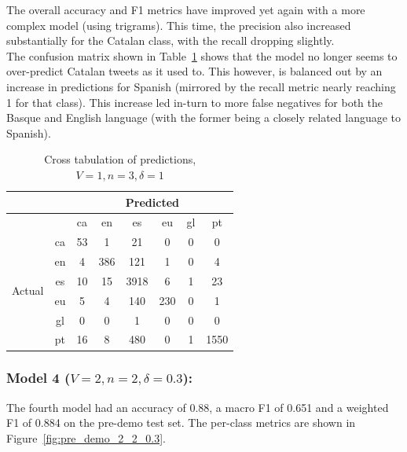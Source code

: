 \documentclass[runningheads]{llncs}
\begin{document}
The overall accuracy and F1 metrics have improved yet again with a more complex model (using trigrams). This time, the precision also increased substantially for the Catalan class, with the recall dropping slightly. \\

The confusion matrix shown in Table~\ref{tab:pre_demo_confusion_1_3_1} shows that the model no longer seems to over-predict Catalan tweets as it used to. This however, is balanced out by an increase in predictions for Spanish (mirrored by the recall metric nearly reaching 1 for that class). This increase led in-turn to more false negatives for both the Basque and English language (with the former being a closely related language to Spanish).

\begin{table}
	\centering
	\caption{Cross tabulation of predictions, $V=1, n=3, \delta=1$}
	\label{tab:pre_demo_confusion_1_3_1}
	\begin{tabular}{|c|c|c|c|c|c|c|c|} \hline
		& & \multicolumn{6}{c|}{Predicted} \\ \hline
		& &  ca &   en &    es &   eu &  gl &    pt \\ \hline
		\multirow{6}{*}{Actual} & ca   &  53 &    1 &    21 &    0 &   0 &     0 \\
		& en   &   4 &  386 &   121 &    1 &   0 &     4 \\
		& es   &  10 &   15 &  3918 &    6 &   1 &    23 \\
		& eu   &   5 &    4 &   140 &  230 &   0 &     1 \\
		& gl   &   0 &    0 &     1 &    0 &   0 &     0 \\
		& pt   &  16 &    8 &   480 &    0 &   1 &  1550 \\ \hline
	\end{tabular}
\end{table}

\subsubsection{Model 4 ($V=2, n=2, \delta=0.3$): }
The fourth model had an accuracy of 0.88, a macro F1 of 0.651 and a weighted F1 of 0.884 on the pre-demo test set. The per-class metrics are shown in Figure~\ref{fig:pre_demo_2_2_0.3}. \\
\end{document}
